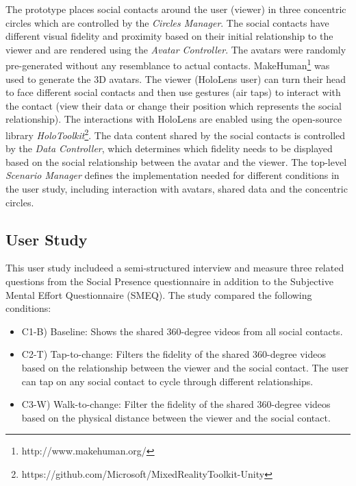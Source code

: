 The prototype places social contacts around the user (viewer) in three concentric circles which are controlled by the \textit{Circles Manager}. The social contacts have different visual fidelity and proximity based on their initial relationship to the viewer and are rendered using the \textit{Avatar Controller}. The avatars were randomly pre-generated without any resemblance to actual contacts. MakeHuman\footnote{http://www.makehuman.org/} was used to generate the 3D avatars. The viewer (HoloLens user) can turn their head to face different social contacts and then use gestures (air taps) to interact with the contact (view their data or change their position which represents the social relationship). The interactions with HoloLens are enabled using the open-source library \textit{HoloToolkit}\footnote{https://github.com/Microsoft/MixedRealityToolkit-Unity}. The data content shared by the social contacts is controlled by the \textit{Data Controller}, which determines which fidelity needs to be displayed based on the social relationship between the avatar and the viewer. The top-level \textit{Scenario Manager} defines the implementation needed for different conditions in the user study, including interaction with avatars, shared data and the concentric circles. 

\subsection{User Study}
This user study includeed a semi-structured interview and measure three related questions from the Social Presence questionnaire in addition to the Subjective Mental Effort Questionnaire (SMEQ). The study compared the following conditions: 

\begin{itemize}
    \item C1-B) Baseline: Shows the shared 360-degree videos from all social contacts.
    \item C2-T) Tap-to-change: Filters the fidelity of the shared 360-degree videos based on the relationship between the viewer and the social contact. The user can tap on any social contact to cycle through different relationships.
    \item C3-W) Walk-to-change: Filter the fidelity of the shared 360-degree videos based on the physical distance between the viewer and the social contact.
\end{itemize}


